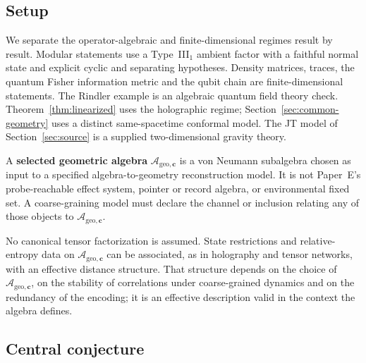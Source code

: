 \subsection{Setup}

We separate the operator-algebraic and finite-dimensional regimes result by result. Modular statements use a Type~III$_1$ ambient factor with a faithful normal state and explicit cyclic and separating hypotheses. Density matrices, traces, the quantum Fisher information metric and the qubit chain are finite-dimensional statements. The Rindler example is an algebraic quantum field theory check. Theorem~\ref{thm:linearized} uses the holographic regime; Section~\ref{sec:common-geometry} uses a distinct same-spacetime conformal model. The JT model of Section~\ref{sec:source} is a supplied two-dimensional gravity theory.

\begin{definition}
\label{def:accessible}
A \textbf{selected geometric algebra} $\mathcal{A}_{\mathrm{geo},\mathbf{c}}$ is a von Neumann subalgebra chosen as input to a specified algebra-to-geometry reconstruction model. It is not Paper~E's probe-reachable effect system, pointer or record algebra, or environmental fixed set. A coarse-graining model must declare the channel or inclusion relating any of those objects to $\mathcal{A}_{\mathrm{geo},\mathbf{c}}$.
\end{definition}

No canonical tensor factorization is assumed. State restrictions and relative-entropy data on $\mathcal{A}_{\mathrm{geo},\mathbf{c}}$ can be associated, as in holography and tensor networks, with an effective distance structure. That structure depends on the choice of $\mathcal{A}_{\mathrm{geo},\mathbf{c}}$, on the stability of correlations under coarse-grained dynamics and on the redundancy of the encoding; it is an effective description valid in the context the algebra defines.

\subsection{Central conjecture}

